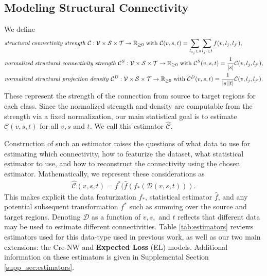 \newpage

\subsection{Modeling Structural Connectivity}
We define
\begin{align*}
&\text{\textit {structural connectivity strength} } \mathcal C : \mathcal V \times \mathcal S \times \mathcal T \to \mathbb R_{\geq 0}  \text{ with } \mathcal C(v,s,t) = \sum_{l_{s_j} \in s} \sum_{l_{j'} \in  t} f(v,l_{j},l_{j'}), \\
&\text{\textit {normalized structural connectivity strength} } \mathcal C^S : \mathcal V \times \mathcal S \times \mathcal T \to \mathbb R_{\geq 0}  \text{ with } \mathcal C^S(v,s,t) = \frac{1}{|s|} \mathcal C(v,l_{j},l_{j'}), \\
&\text{\textit {normalized structural projection density} } \mathcal C^D : \mathcal V \times \mathcal S \times \mathcal T \to \mathbb R_{\geq 0} \text{ with } \mathcal C^D(v,s,t) = \frac{1}{| s | | t|}\mathcal C(v,l_{j},l_{j'}).
\end{align*}
These represent the strength of the connection from source to target regions for each class.
Since the normalized strength and density are computable from the strength via a fixed normalization, our main statistical goal is to estimate $\mathcal C (v,s,t) $ for all $v, s$ and $t$.%
We call this estimator $\widehat { \mathcal C } $.

Construction of such an estimator raises the questions of what data to use for estimating which connectivity, how to featurize the dataset, what statistical estimator to use, and how to reconstruct the connectivity using the chosen estimator.
Mathematically, we represent these considerations as 
\begin{align}
\label{eq:estimator}
\widehat { \mathcal C }(v,s,t) = f^* (\widehat f (f_*( \mathcal D(v,s,t))).
\end{align}
This makes explicit the data featurization $f_{*}$, statistical estimator $\widehat f$, and any potential subsequent transformation $f^*$ such as summing over the source and target regions.
Denoting $ \mathcal D$ as a function of $v,s,$ and $t$ reflects that different data may be used to estimate different connectivities.
Table \ref{tab:estimators} reviews estimators used for this data-type used in previous work, as well as our two main extensions: the Cre-NW and \textbf{Expected Loss} (EL) models.
Additional information on these estimators is given in Supplemental Section \ref{supp_sec:estimators}.

